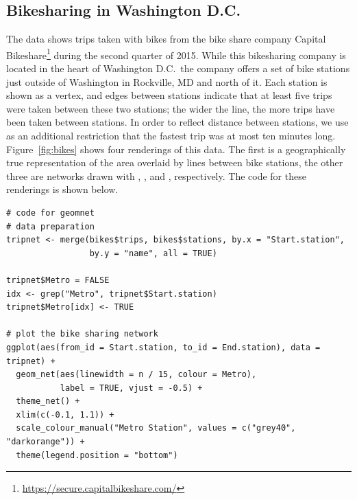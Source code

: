 
\subsection{Bikesharing in Washington D.C.} %

The data shows trips taken with bikes from the bike share company Capital Bikeshare\footnote{\url{https://secure.capitalbikeshare.com/}} during the second quarter of 2015.
While this bikesharing company is located in the heart of Washington D.C.\ the company offers a set of bike stations just outside of Washington in Rockville, MD and north of it. Each station is shown as a vertex, and edges between stations indicate that at least five trips were taken between these two stations; the wider the line, the more trips have been taken between stations. In order to reflect distance between stations, we use as an additional restriction that the fastest trip was at most ten minutes long.
Figure~\ref{fig:bikes} shows four renderings of this data. The first is a geographically true representation of the area overlaid by lines between bike stations, the other three are networks drawn with , , and , respectively.
The code for these renderings is shown below.

\begin{knitrout}
\color{fgcolor}\begin{kframe}
\begin{verbatim}
# code for geomnet
# data preparation
tripnet <- merge(bikes$trips, bikes$stations, by.x = "Start.station",
                 by.y = "name", all = TRUE)

tripnet$Metro = FALSE
idx <- grep("Metro", tripnet$Start.station)
tripnet$Metro[idx] <- TRUE

# plot the bike sharing network
ggplot(aes(from_id = Start.station, to_id = End.station), data = tripnet) +
  geom_net(aes(linewidth = n / 15, colour = Metro),
           label = TRUE, vjust = -0.5) +
  theme_net() +
  xlim(c(-0.1, 1.1)) +
  scale_colour_manual("Metro Station", values = c("grey40", "darkorange")) +
  theme(legend.position = "bottom")
\end{verbatim}
\end{kframe}
\end{knitrout}


